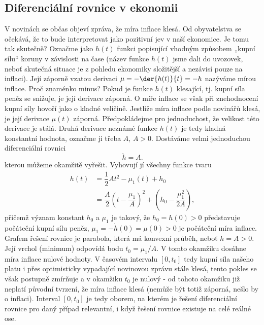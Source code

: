     \subsection{Diferenciální rovnice v ekonomii}
      V novinách se občas objeví zpráva, že míra inflace klesá. Od obyvatelstva se očekává, že to
      bude interpretovat jako pozitivní jev v naší ekonomice. Je tomu tak skutečně? Označme jako
      \(h(t)\) funkci popisující vhodným způsobem „kupní sílu“ koruny v závislosti na čase (název
      funkce \(h(t)\) jsme dali do uvozovek, neboť skutečná situace je z pohledu ekonomiky
      složitější a nezávisí pouze na inflaci). Její záporně vzatou derivaci \(\mu = -\der{h(t)}{t} =
      -h\) nazýváme mírou inflace. Proč znaménko minus? Pokud je funkce \(h(t)\) klesající, tj.
      kupní síla peněz se snižuje, je její derivace záporná. O míře inflace se však při znehodnocení
      kupní síly hovoří jako o kladné veličině. Jestliže míra inflace podle novinářů klesá, je její
      derivace \(\mu(t)\) záporná. Předpokládejme pro jednoduchost, že velikost této derivace je
      stálá. Druhá derivace neznámé funkce \(h(t)\) je tedy kladná konstantní hodnota, označme ji
      třeba \(A\), \(A > 0\). Dostáváme velmi jednoduchou diferenciální rovnici
      \begin{equation*}
        \ddot{h} = A.
      \end{equation*}
      kterou můžeme okamžitě vyřešit. Vyhovují jí všechny funkce tvaru
      \begin{align*}
        h(t) &= \dfrac{1}{2}At^2 -\mu_1(t) + h_0 \\
             &= \dfrac{A}{2}\left(t-\dfrac{\mu_1}{A}\right)^2+\left(h_0-\dfrac{\mu_1^2}{2A}\right), 
      \end{align*}
      přičemž význam konstant \(h_0\) a \(\mu_1\) je takový, že \(h_0 = h(0) > 0\) představuje
      počáteční kupní sílu peněz, \(\mu_1 = -\dot{h}(0) = \mu(0) > 0\) je počáteční míra inflace.
      Grafem řešení rovnice je parabola, která má konvexní průběh, neboť \(\ddot{h} = A > 0\). Její
      vrchol (minimum) odpovídá bodu \(t_0 = \mu_1/A\). V tomto okamžiku dosáhne míra inflace nulové
      hodnoty. V časovém intervalu \([0, t_0]\) tedy kupní síla našeho platu i přes optimisticky
      vypadající novinovou zprávu stále klesá, tento pokles se však postupně zmírňuje a v okamžiku
      \(t_0\) je nulový - od tohoto okamžiku již neplatí původní tvrzení, že míra inflace klesá
      (nemůže být totiž záporná, nešlo by o inflaci). Interval \([0, t_0]\) je tedy oborem, na
      kterém je řešení diferenciální rovnice pro daný případ relevantní, i když řešení rovnice
      existuje na celé reálné ose.
      
